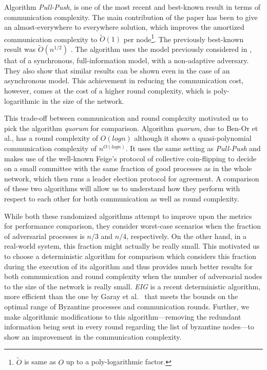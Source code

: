 Algorithm
\textit{Pull-Push}, is one of the most recent and best-known result in terms of
communication complexity. The main contribution of the paper has been to give
an almost-everywhere to everywhere solution, which improves the amortized
communication complexity to $\tilde{O}(1)$ per node\footnote{$\tilde{O}$ is
same as $O$ up to a poly-logarithmic factor.}. The previously best-known result
was $\tilde{O}(n^{1/2})$ \cite{KLST11}.  The algorithm uses the model
previously considered in \cite{KLST11,KSSV06,BPV06,KS09}, that of
a synchronous, full-information model, with a non-adaptive adversary. They also
show that similar results can be shown even in the case of an asynchronous
model. This achievement in reducing the communication cost, however, comes at
the cost of a higher round complexity, which is poly-logarithmic in the size of
the network. 

This trade-off between communication and round complexity
motivated us to pick the algorithm \textit{quorum} for comparison. Algorithm
\textit{quorum}, due to Ben-Or et al., has a round complexity of $O(logn)$
although it shows a quasi-polynomial communication complexity of $n^{O(logn)}$.
It uses the same setting as \textit{Pull-Push} and makes use of the well-known
Feige's protocol of collective coin-flipping to decide on a small committee
with the same fraction of good processes as in the whole network, which then
runs a leader election protocol for agreement. A comparison of these two
algorithms will allow us to understand how they perform with respect to each 
other for both communication as well as round complexity. 

While both these randomized algorithms attempt to improve upon the metrics for
performance comparison, they consider worst-case scenarios when the fraction of
adversarial processes is $n/3$ and $n/4$, respectively. On the other hand, in
a real-world system, this fraction might actually be really small. This
motivated us to choose a deterministic algorithm for comparison which considers
this fraction during the execution of its algorithm and thus provides much
better results for both communication and round complexity when the number of
adversarial nodes to the size of the network is really small. \textit{EIG} is
a recent deterministic algorithm, more efficient than the one by Garay et
al.~\cite{GarayM98} that meets the bounds on the optimal range of Byzantine
processes and communication rounds. Further, we make algorithmic modifications
to this algorithm---removing the redundant information being sent in every round
regarding the list of byzantine nodes---to show an improvement in the
communication complexity. 



